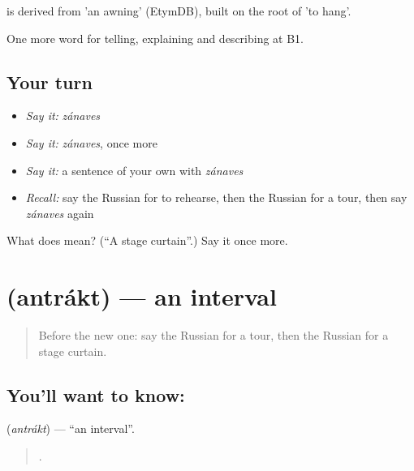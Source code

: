 \begin{cousinweb}
\emph{} is derived from \emph{} 'an awning' (EtymDB), built on the root of \emph{} 'to hang'.
\end{cousinweb}

\begin{grammarlens}[title={What you've built}]
One more word for telling, explaining and describing at B1.
\end{grammarlens}

\subsection*{Your turn}
\begin{itemize}
\raggedright
  \item \emph{Say it:} \emph{zánaves}
  \item \emph{Say it:} \emph{zánaves}, once more
  \item \emph{Say it:} a sentence of your own with \emph{zánaves}
  \item \emph{Recall:} say the Russian for to rehearse, then the Russian for a tour, then say \emph{zánaves} again
\end{itemize}

\begin{tcolorbox}[breakable,colback=teal!4,colframe=teal!35!black,title={Before you move on}]
What does  mean? (\textquotedblleft{}A stage curtain\textquotedblright{}.) Say it once more.
\end{tcolorbox}
\section[\texorpdfstring{\ru{антракт} (antrákt)}{антракт (antrákt)}]{ (antrákt) — an interval}

\label{lesson:RU-C519-antrakt}



\begin{quote}
Before the new one: say the Russian for a tour, then the Russian for a stage curtain.
\end{quote}

\subsection*{You'll want to know: }
\textbf{} (\emph{antrákt}) — \textquotedblleft{}an interval\textquotedblright{}.

\begin{quote}
      .
\end{quote}

